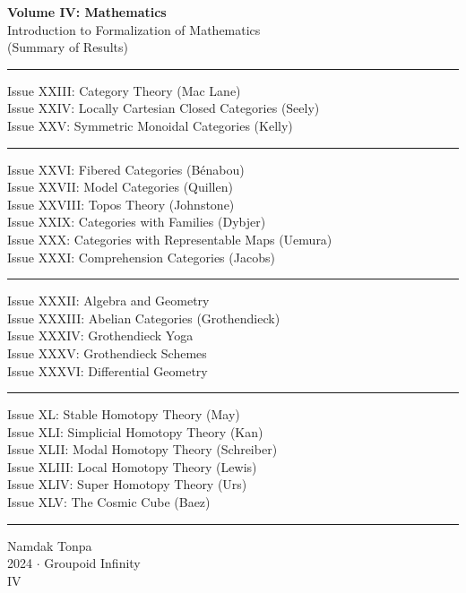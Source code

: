 \documentclass{article}
\begin{document}
\begin{titlepage}
    \centering
    \vspace*{0.5in}
    \Huge
    \textbf{Volume IV: Mathematics} \\
    \LARGE
    Introduction to Formalization of Mathematics \\
    (Summary of Results) \\
    \vspace{1.5in}
    \small
    \flushleft
    \vspace{-2mm} \rule{\textwidth}{0.4pt}
    Issue XXIII: Category Theory (Mac Lane) \\
    Issue XXIV: Locally Cartesian Closed Categories (Seely) \\
    Issue XXV: Symmetric Monoidal Categories (Kelly) \\
    \vspace{-2mm} \rule{\textwidth}{0.4pt}
    Issue XXVI: Fibered Categories (Bénabou) \\
    Issue XXVII: Model Categories (Quillen) \\
    Issue XXVIII: Topos Theory (Johnstone) \\
    Issue XXIX: Categories with Families (Dybjer) \\
    Issue XXX: Categories with Representable Maps (Uemura) \\
    Issue XXXI: Comprehension Categories (Jacobs) \\
    \vspace{-2mm} \rule{\textwidth}{0.4pt}
    Issue XXXII: Algebra and Geometry \\
    Issue XXXIII: Abelian Categories (Grothendieck) \\
    Issue XXXIV: Grothendieck Yoga \\
    Issue XXXV: Grothendieck Schemes \\
    Issue XXXVI: Differential Geometry \\
    \vspace{-2mm} \rule{\textwidth}{0.4pt}
    Issue XL: Stable Homotopy Theory (May) \\
    Issue XLI: Simplicial Homotopy Theory (Kan) \\
    Issue XLII: Modal Homotopy Theory (Schreiber) \\
    Issue XLIII: Local Homotopy Theory (Lewis) \\
    Issue XLIV: Super Homotopy Theory (Urs) \\
    Issue XLV: The Cosmic Cube (Baez) \\
    \vspace{-2mm} \rule{\textwidth}{0.4pt}
    \centering
    \vfill
    \large
    Namdak Tonpa \\
    \Large
    2024 $\cdot$ Groupoid Infinity \\
    IV
\end{titlepage}
\end{document}
